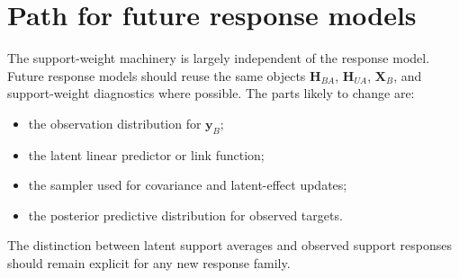 \documentclass[11pt]{article}
\newcommand{\by}{\bm{y}}
\newcommand{\bH}{\bm{H}}
\newcommand{\bX}{\bm{X}}
\begin{document}
\section{Path for future response models}

The support-weight machinery is largely independent of the response model.
Future response models should reuse the same objects \(\bH_{BA}\),
\(\bH_{UA}\), \(\bX_B\), and support-weight diagnostics where possible. The
parts likely to change are:
\begin{itemize}
\item the observation distribution for \(\by_B\);
\item the latent linear predictor or link function;
\item the sampler used for covariance and latent-effect updates;
\item the posterior predictive distribution for observed targets.
\end{itemize}
The distinction between latent support averages and observed support
responses should remain explicit for any new response family.



\end{document}
